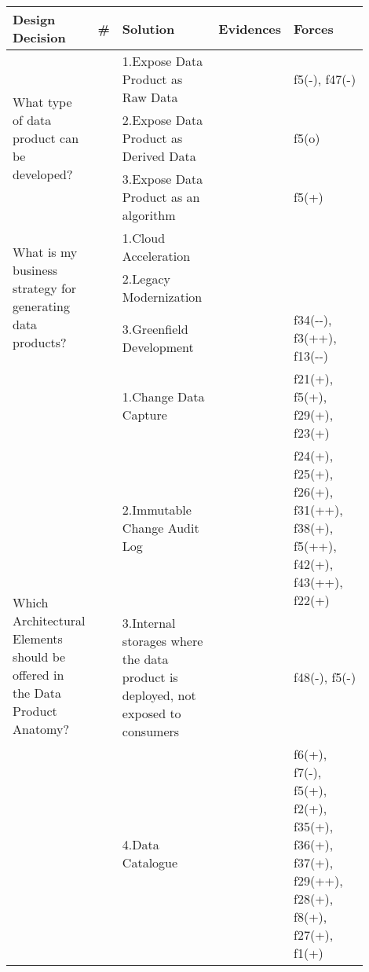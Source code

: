 \begin{tabular}{|p{0.12\linewidth}|p{0.015\linewidth}|p{0.3\linewidth}|p{0.15\linewidth}|p{0.31\linewidth}|}
\hline
{\bf Design Decision} & {\bf \#} & {\bf Solution} & {\bf Evidences} & {\bf Forces}\\
\hline
\multirow{3}{\linewidth}{What type of data product can be developed?} &\cellcolor{emerald_shape_4}{} &1.Expose Data Product as Raw Data&\cellcolor{emerald_shape_7}{s1, s2, s6, s7, s9, s14, s15, s27, s34, s43, i1, i3, i4, i5, i6} & f5(-), f47(-)\\
 & \cellcolor{emerald_shape_4}{} & 2.Expose Data Product as Derived Data&\cellcolor{emerald_shape_6}{s1, s2, s6, s9, s14, s15, s27, s34, i2, i4} & f5(o)\\
 & \multirow{-3}{\linewidth}{ \cellcolor{emerald_shape_4}{16}} &3.Expose Data Product as an algorithm&\cellcolor{emerald_shape_3}{s2, s6, i5} & f5(+)\\
\multirow{3}{\linewidth}{What is my business strategy for generating data products?} &\cellcolor{emerald_shape_6}{} &1.Cloud Acceleration&\cellcolor{emerald_shape_1}{} & \\
 & \cellcolor{emerald_shape_6}{} & 2.Legacy Modernization&\cellcolor{emerald_shape_1}{} & \\
 & \multirow{-3}{\linewidth}{ \cellcolor{emerald_shape_6}{40}} &3.Greenfield Development&\cellcolor{emerald_shape_7}{s1, s2, s3, s5, s6, s7, s8, s9, s11, s14, s15, s18, s20, s23, s25, s28, s30, s31, s32, s33, s35, s37, s38, s39, s40, s41, s42, s43, s45, s49, i1, i2, i3} & f34(-{}-), f3(++), f13(-{}-)\\
\multirow{7}{\linewidth}{Which Architectural Elements should be offered in the Data Product Anatomy?} &\cellcolor{emerald_shape_6}{} &1.Change Data Capture&\cellcolor{emerald_shape_4}{s4, s17, s20, s38, s45, s48, s53, s54, s55, s56, i2, i3} & f21(+), f5(+), f29(+), f23(+)\\
 & \cellcolor{emerald_shape_6}{} & 2.Immutable Change Audit Log&\cellcolor{emerald_shape_5}{s4, s8, s12, s31, s32, s35, s36, s45, s47, s48, s53, s54, s55, s56, s57, i1, i2, i3, i4} & f24(+), f25(+), f26(+), f31(++), f38(+), f5(++), f42(+), f43(++), f22(+)\\
 & \cellcolor{emerald_shape_6}{} & 3.Internal storages where the data product is deployed, not exposed to consumers&\cellcolor{emerald_shape_4}{s4, s13, s15, s32, s33, s36, s49, i1, i4} & f48(-), f5(-)\\
 & \cellcolor{emerald_shape_6}{} & 4.Data Catalogue&\cellcolor{emerald_shape_6}{s1, s3, s5, s7, s9, s15, s16, s25, s30, s31, s32, s37, s43, s47, s48, s53, s55, i1, i3, i4, i5, i6} & f6(+), f7(-), f5(+), f2(+), f35(+), f36(+), f37(+), f29(++), f28(+), f8(+), f27(+), f1(+)\\

\end{tabular}
